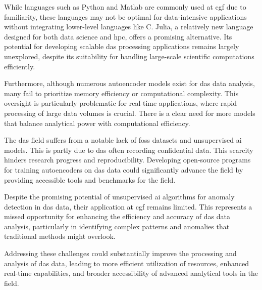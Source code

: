 While languages such as Python and Matlab are commonly used at \acrshort{cgf} due to familiarity, these languages may not be optimal for data-intensive applications without integrating lower-level languages like C. Julia, a relatively new language designed for both data science and \acrfull{hpc}, offers a promising alternative. Its potential for developing scalable \acrshort{das} processing applications remains largely unexplored, despite its suitability for handling large-scale scientific computations efficiently. 

Furthermore, although numerous autoencoder models exist for \acrshort{das} data analysis, many fail to prioritize memory efficiency or computational complexity. This oversight is particularly problematic for real-time applications, where rapid processing of large data volumes is crucial. There is a clear need for more models that balance analytical power with computational efficiency. 

The \acrshort{das} field suffers from a notable lack of \acrfull{foss} datasets and unsupervised \acrshort{ai} models. This is partly due to \acrshort{das} often recording confidential data. This scarcity hinders research progress and reproducibility. Developing open-source programs for training autoencoders on \acrshort{das} data could significantly advance the field by providing accessible tools and benchmarks for the field.  

Despite the promising potential of unsupervised \acrshort{ai} algorithms for anomaly detection in \acrshort{das} data, their application at \acrshort{cgf} remains limited. This represents a missed opportunity for enhancing the efficiency and accuracy of \acrshort{das} data analysis, particularly in identifying complex patterns and anomalies that traditional methods might overlook.

Addressing these challenges could substantially improve the processing and analysis of \acrshort{das} data, leading to more efficient utilization of resources, enhanced real-time capabilities, and broader accessibility of advanced analytical tools in the field.

